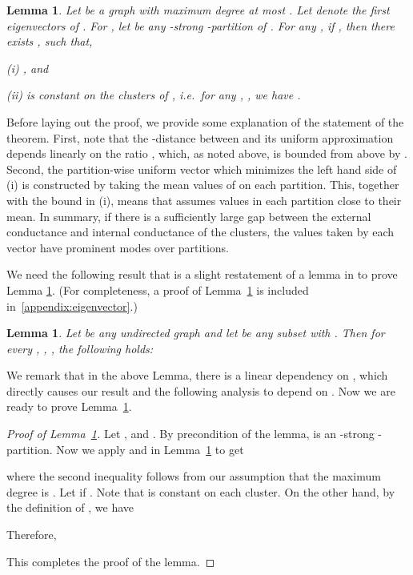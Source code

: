\documentclass[11pt]{article}
\theoremstyle{plain}
\newtheorem{lemma}[theorem]{Lemma}
\begin{document}
\begin{lemma}\label{lem:uniformity}
Let  be a graph with maximum degree at most .
Let  denote the first  eigenvectors of .
For , let  be any -strong
-partition of .
For any , if
, then there exists , such that,
\begin{description}
  \item{(i)}  , and
  \item{(ii)}  is constant on the clusters of , i.e.~for any , , we have .
\end{description}
\end{lemma}

Before laying out the proof, we provide some explanation of the statement of the
theorem. First, note that the -distance between  and its
uniform approximation  depends linearly on the ratio
, which, as noted above, is bounded from above by
. Second, the partition-wise uniform vector
 which minimizes the left hand side of (i) is constructed by
taking the mean values of  on each partition. This, together with the
bound in (i), means that  assumes values in each partition close to their
mean. In summary, if there is a sufficiently large gap between the external
conductance  and internal conductance  of the
clusters, the values taken by each vector  have  prominent modes over
 partitions.

We need the following result that is a slight restatement of a lemma in
\cite{DBLP:conf/stoc/CzumajPS15} to prove Lemma \ref{lem:uniformity}. (For completeness, a
proof of Lemma~\ref{lem:clusterable-eigenvector} is included in~\ref{appendix:eigenvector}.)

\begin{lemma}
\label{lem:clusterable-eigenvector}
Let  be any undirected graph and let  be any subset with
. Then for every , ,
, the following holds:

\end{lemma}

We remark that in the above Lemma, there is a linear dependency on , which directly causes our result and the following analysis to depend on . Now we are ready to prove Lemma~\ref{lem:uniformity}.
\begin{proof}[Proof of Lemma~\ref{lem:uniformity}]
Let , and . By precondition of the lemma,  is an -strong
-partition. Now we apply  and  in
Lemma~\ref{lem:clusterable-eigenvector} to get

where the second inequality follows from our assumption that the maximum degree is .
Let  if . Note that  is constant on each cluster. On the other hand, by the definition of , we have


Therefore,

This completes the proof of the lemma.
\end{proof}
\end{document}
